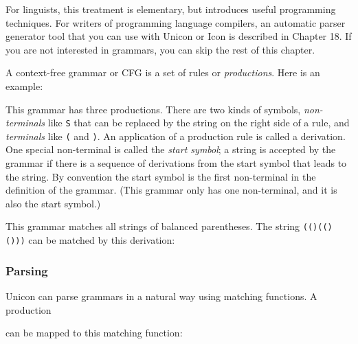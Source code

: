 For linguists, this treatment is elementary, but introduces useful
programming techniques. For writers of programming language compilers,
an automatic parser generator tool that you can use with Unicon or Icon
is described in Chapter 18. If you are not interested in grammars, you
can skip the rest of this chapter.

A context-free grammar or CFG is a set of
rules or \textit{productions}. Here is an example:


This grammar has three productions. There are two kinds of symbols,
\textit{non-terminals} like \texttt{S} that can be replaced by the
string on the right side of a rule, and \textit{terminals} like
\texttt{(} and \texttt{)}. An application of a production rule is called
a derivation. One special non-terminal is called the
\textit{start symbol}; a string is accepted by the grammar if there is a
sequence of derivations from the start symbol that leads to the string.
By convention the start symbol is the first non-terminal in the
definition of the grammar. (This grammar only has one non-terminal, and
it is also the start symbol.)

This grammar matches all strings of balanced parentheses. The string
\texttt{(()(()()))} can be matched by this derivation:


\subsubsection{Parsing}

Unicon can parse grammars in a natural way using matching
functions. A production


\noindent
can be mapped to this matching function:


